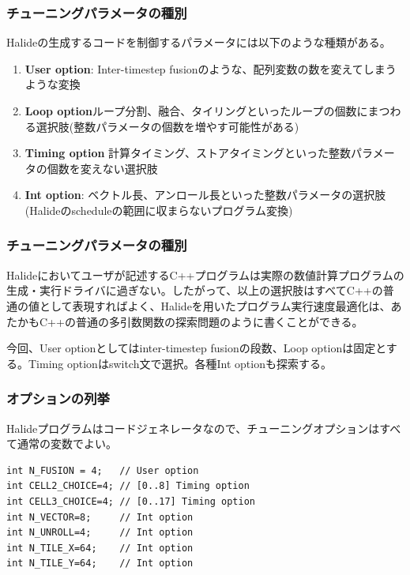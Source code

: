 \documentclass[dvipdfmx,cjk]{beamer}
\begin{document}
\begin{frame}\frametitle{チューニングパラメータの種別}
  Halideの生成するコードを制御するパラメータには以下のような種類がある。
  \begin{enumerate}
  \item  {\bf User option}: Inter-timestep fusionのような、配列変数の数を変えてしまうような変換
  \item  {\bf Loop option}ループ分割、融合、タイリングといったループの個数にまつわる選択肢(整数パラメータの個数を増やす可能性がある)
  \item  {\bf Timing option} 計算タイミング、ストアタイミングといった整数パラメータの個数を変えない選択肢
  \item  {\bf Int option}: ベクトル長、アンロール長といった整数パラメータの選択肢
    (Halideのscheduleの範囲に収まらないプログラム変換)
  \end{enumerate}
\end{frame}
  
\begin{frame}\frametitle{チューニングパラメータの種別}  
  Halideにおいてユーザが記述するC++プログラムは実際の数値計算プログラムの生成・実行ドライバに過ぎない。したがって、以上の選択肢はすべてC++の普通の値として表現すればよく、Halideを用いたプログラム実行速度最適化は、あたかもC++の普通の多引数関数の探索問題のように書くことができる。

  今回、User optionとしてはinter-timestep fusionの段数、Loop optionは固定とする。Timing optionはswitch文で選択。各種Int optionも探索する。
\end{frame}


\begin{frame}[fragile]\frametitle{オプションの列挙}

Halideプログラムはコードジェネレータなので、チューニングオプションはすべて通常の変数でよい。

\begingroup \fontsize{8pt}{9pt}\selectfont
\begin{verbatim}
int N_FUSION = 4;   // User option
int CELL2_CHOICE=4; // [0..8] Timing option
int CELL3_CHOICE=4; // [0..17] Timing option
int N_VECTOR=8;     // Int option
int N_UNROLL=4;     // Int option
int N_TILE_X=64;    // Int option
int N_TILE_Y=64;    // Int option
\end{verbatim}
\endgroup

\end{frame}
\end{document}
